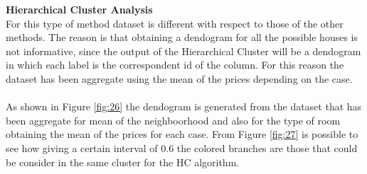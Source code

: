 \documentclass{FR16}
\begin{document}
\newpage
\noindent \textbf{ Hierarchical Cluster Analysis}\\
For this type of method dataset is different with respect to those of the other methods. The reason is that obtaining a dendogram for all the possible houses is not informative, since the output of the Hierarchical Cluster will be a dendogram in which each label is the correspondent id of the column. For this reason the dataset has been aggregate using the mean of the prices depending on the case.
\\\\
\noindent  As shown in Figure \ref{fig:26} the dendogram is generated from the dataset that has been aggregate for mean of the neighboorhood and also for the type of room obtaining the mean of the prices for each case. From Figure \ref{fig:27} is possible to see how giving a certain interval of 0.6 the colored branches are those that could be consider in the same cluster for the HC algorithm. 
\end{document}
